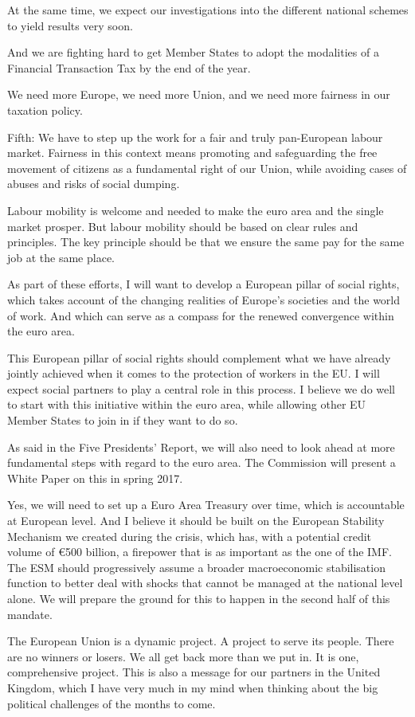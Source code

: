 \documentclass[a4paper,11pt]{article}
\begin{document}
At the same time, we expect our investigations into the different national schemes to yield results very soon.

And we are fighting hard to get Member States to adopt the modalities of a Financial Transaction Tax by the end of the year.

We need more Europe, we need more Union, and we need more fairness in our taxation policy.

Fifth: We have to step up the work for a fair and truly pan-European labour market. Fairness in this context means promoting and safeguarding the free movement of citizens as a fundamental right of our Union, while avoiding cases of abuses and risks of social dumping.

Labour mobility is welcome and needed to make the euro area and the single market prosper. But labour mobility should be based on clear rules and principles. The key principle should be that we ensure the same pay for the same job at the same place.

As part of these efforts, I will want to develop a European pillar of social rights, which takes account of the changing realities of Europe's societies and the world of work. And which can serve as a compass for the renewed convergence within the euro area.

This European pillar of social rights should complement what we have already jointly achieved when it comes to the protection of workers in the EU. I will expect social partners to play a central role in this process. I believe we do well to start with this initiative within the euro area, while allowing other EU Member States to join in if they want to do so.

As said in the Five Presidents’ Report, we will also need to look ahead at more fundamental steps with regard to the euro area. The Commission will present a White Paper on this in spring 2017.

Yes, we will need to set up a Euro Area Treasury over time, which is accountable at European level. And I believe it should be built on the European Stability Mechanism we created during the crisis, which has, with a potential credit volume of \euro500 billion, a firepower that is as important as the one of the IMF. The ESM should progressively assume a broader macroeconomic stabilisation function to better deal with shocks that cannot be managed at the national level alone. We will prepare the ground for this to happen in the second half of this mandate.

The European Union is a dynamic project. A project to serve its people. There are no winners or losers. We all get back more than we put in. It is one, comprehensive project. This is also a message for our partners in the United Kingdom, which I have very much in my mind when thinking about the big political challenges of the months to come.
\end{document}
